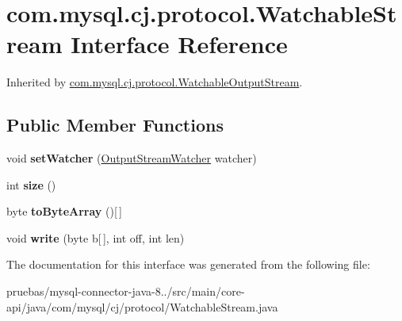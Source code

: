 \hypertarget{interfacecom_1_1mysql_1_1cj_1_1protocol_1_1_watchable_stream}{}\section{com.\+mysql.\+cj.\+protocol.\+Watchable\+Stream Interface Reference}
\label{interfacecom_1_1mysql_1_1cj_1_1protocol_1_1_watchable_stream}


Inherited by \mbox{\hyperlink{classcom_1_1mysql_1_1cj_1_1protocol_1_1_watchable_output_stream}{com.\+mysql.\+cj.\+protocol.\+Watchable\+Output\+Stream}}.

\subsection*{Public Member Functions}
\begin{DoxyCompactItemize}
\item 
\mbox{\label{interfacecom_1_1mysql_1_1cj_1_1protocol_1_1_watchable_stream_aa3a3e9b08ec23693950ef766decd7205}} 
void {\bfseries set\+Watcher} (\mbox{\hyperlink{interfacecom_1_1mysql_1_1cj_1_1protocol_1_1_output_stream_watcher}{Output\+Stream\+Watcher}} watcher)
\item 
\mbox{\label{interfacecom_1_1mysql_1_1cj_1_1protocol_1_1_watchable_stream_a12dc589ba91926b7bb5ee65e59c262c7}} 
int {\bfseries size} ()
\item 
\mbox{\label{interfacecom_1_1mysql_1_1cj_1_1protocol_1_1_watchable_stream_a1f74a409c152e12945e1448b45bcc110}} 
byte {\bfseries to\+Byte\+Array} ()\mbox{[}$\,$\mbox{]}
\item 
\mbox{\label{interfacecom_1_1mysql_1_1cj_1_1protocol_1_1_watchable_stream_a266c3021dfaf9c1d9d46ec2c63d83870}} 
void {\bfseries write} (byte b\mbox{[}$\,$\mbox{]}, int off, int len)
\end{DoxyCompactItemize}


The documentation for this interface was generated from the following file\+:\begin{DoxyCompactItemize}
\item 
pruebas/mysql-\/connector-\/java-\/8../src/main/core-\/api/java/com/mysql/cj/protocol/Watchable\+Stream.\+java\end{DoxyCompactItemize}
